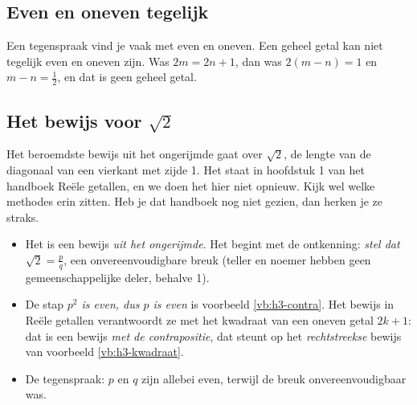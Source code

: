 \subsection{Even en oneven tegelijk}

Een tegenspraak vind je vaak met even en oneven. Een geheel getal kan niet tegelijk even en oneven zijn. Was $2m = 2n + 1$, dan was $2(m - n) = 1$ en $m - n = \tfrac12$, en dat is geen geheel getal.


\begin{oefeningen}
\end{oefeningen}

\subsection{Het bewijs voor $\sqrt2$}

Het beroemdste bewijs uit het ongerijmde gaat over $\sqrt2$, de lengte van de diagonaal van een vierkant met zijde 1. Het staat in hoofdstuk 1 van het handboek Reële getallen, en we doen het hier niet opnieuw. Kijk wel welke methodes erin zitten. Heb je dat handboek nog niet gezien, dan herken je ze straks.

\begin{itemize}
\item Het is een bewijs \textit{uit het ongerijmde}. Het begint met de ontkenning: \textit{stel dat $\sqrt2 = \tfrac pq$}, een onvereenvoudigbare breuk (teller en noemer hebben geen gemeenschappelijke deler, behalve 1).
\item De stap \textit{$p^2$ is even, dus $p$ is even} is voorbeeld \ref{vb:h3-contra}. Het bewijs in Reële getallen verantwoordt ze met het kwadraat van een oneven getal $2k + 1$: dat is een bewijs \textit{met de contrapositie}, dat steunt op het \textit{rechtstreekse} bewijs van voorbeeld \ref{vb:h3-kwadraat}.
\item De tegenspraak: $p$ en $q$ zijn allebei even, terwijl de breuk onvereenvoudigbaar was.
\end{itemize}

